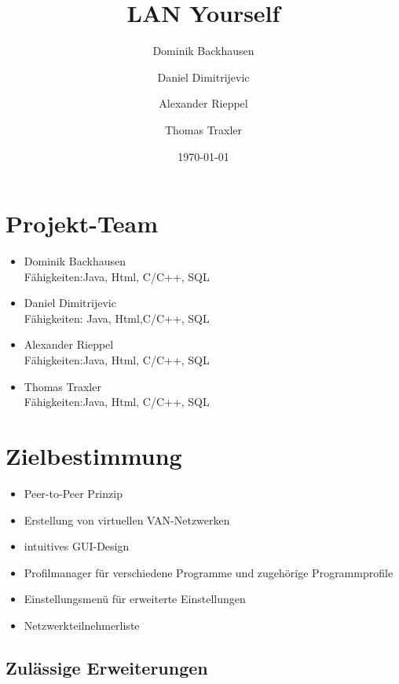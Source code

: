\documentclass[a4paper,12pt]{scrreprt}
\begin{document}
\author{Dominik Backhausen \and Daniel Dimitrijevic \and Alexander Rieppel \and Thomas Traxler}
\subject{Pflichtenheft}
\title{LAN Yourself}
\date{\today}
\maketitle
\tableofcontents

\chapter{Projekt-Team}
	\begin{itemize}
	\item Dominik Backhausen\\
	Fähigkeiten:Java, Html, C/C++, SQL
	\item Daniel Dimitrijevic\\
	Fähigkeiten: Java, Html,C/C++, SQL
	\item Alexander Rieppel\\
		Fähigkeiten:Java, Html, C/C++, SQL    
	\item Thomas Traxler\\
	Fähigkeiten:Java, Html, C/C++, SQL
	\end{itemize}
	
	
\chapter{Zielbestimmung}
	\begin{itemize}
	\item Peer-to-Peer Prinzip
	\item Erstellung von virtuellen VAN-Netzwerken
	\item intuitives GUI-Design
	\item Profilmanager für verschiedene Programme und zugehörige Programmprofile
	\item Einstellungsmenü für erweiterte Einstellungen
	\item Netzwerkteilnehmerliste
	\end{itemize}
	
	\section{Zulässige Erweiterungen}
	
\end{document}
